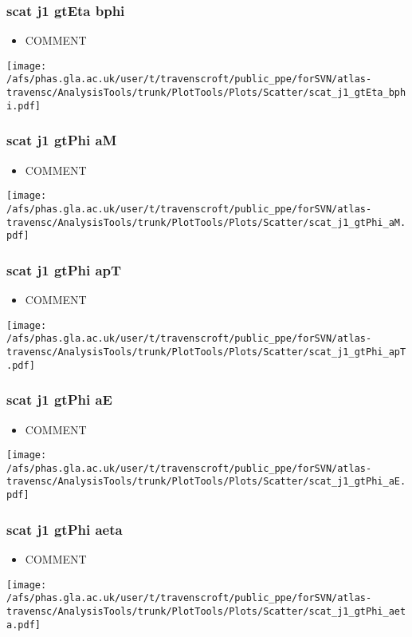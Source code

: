 \documentclass{beamer}
\begin{document}
\begin{frame}
\frametitle{scat j1 gtEta bphi}
\begin{itemize}
\item COMMENT
\end{itemize}
\begin{center}
\texttt{[image: /afs/phas.gla.ac.uk/user/t/travenscroft/public\_ppe/forSVN/atlas-travensc/AnalysisTools/trunk/PlotTools/Plots/Scatter/scat\_j1\_gtEta\_bphi.pdf]}
\end{center}
\end{frame}

\begin{frame}
\frametitle{scat j1 gtPhi aM}
\begin{itemize}
\item COMMENT
\end{itemize}
\begin{center}
\texttt{[image: /afs/phas.gla.ac.uk/user/t/travenscroft/public\_ppe/forSVN/atlas-travensc/AnalysisTools/trunk/PlotTools/Plots/Scatter/scat\_j1\_gtPhi\_aM.pdf]}
\end{center}
\end{frame}

\begin{frame}
\frametitle{scat j1 gtPhi apT}
\begin{itemize}
\item COMMENT
\end{itemize}
\begin{center}
\texttt{[image: /afs/phas.gla.ac.uk/user/t/travenscroft/public\_ppe/forSVN/atlas-travensc/AnalysisTools/trunk/PlotTools/Plots/Scatter/scat\_j1\_gtPhi\_apT.pdf]}
\end{center}
\end{frame}

\begin{frame}
\frametitle{scat j1 gtPhi aE}
\begin{itemize}
\item COMMENT
\end{itemize}
\begin{center}
\texttt{[image: /afs/phas.gla.ac.uk/user/t/travenscroft/public\_ppe/forSVN/atlas-travensc/AnalysisTools/trunk/PlotTools/Plots/Scatter/scat\_j1\_gtPhi\_aE.pdf]}
\end{center}
\end{frame}

\begin{frame}
\frametitle{scat j1 gtPhi aeta}
\begin{itemize}
\item COMMENT
\end{itemize}
\begin{center}
\texttt{[image: /afs/phas.gla.ac.uk/user/t/travenscroft/public\_ppe/forSVN/atlas-travensc/AnalysisTools/trunk/PlotTools/Plots/Scatter/scat\_j1\_gtPhi\_aeta.pdf]}
\end{center}
\end{frame}
\end{document}
